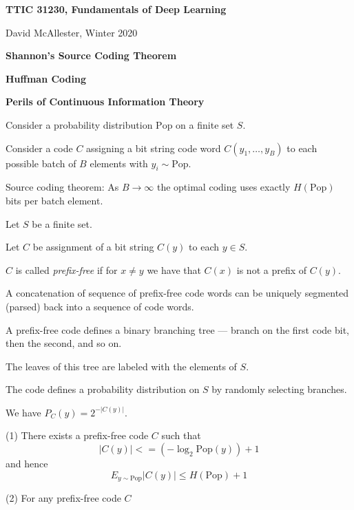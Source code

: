 




{\Huge

  \centerline{\bf TTIC 31230, Fundamentals of Deep Learning}
  \bigskip
  \centerline{David McAllester, Winter 2020}

  \vfill
  \centerline{\bf Shannon's Source Coding Theorem}
  \vfill
  \centerline{\bf Huffman Coding}
  \vfill
  \centerline{\bf Perils of Continuous Information Theory}
  \vfill
\vfill
\vfill


Consider a probability distribution $\mathrm{Pop}$ on a finite set $S$.

\vfill
Consider a code $C$ assigning a bit string code word $C(y_1,\ldots,y_B)$ to each possible batch of $B$ elements with $y_i \sim \mathrm{Pop}$.

\vfill
Source coding theorem: As $B \rightarrow \infty$ the optimal coding uses exactly $H(\mathrm{Pop})$
bits per batch element.


Let $S$ be a finite set.

\vfill
Let $C$ be assignment of a bit string $C(y)$ to each $y \in S$.

\vfill
$C$ is called {\em prefix-free} if for $x \not = y$ we have that $C(x)$ is not a prefix of $C(y)$.

\vfill
A concatenation of sequence of prefix-free code words can be uniquely segmented (parsed) back into a sequence of code words.


A prefix-free code defines a binary branching tree --- branch on the first code bit, then the second, and so on.

\vfill
The leaves of this tree are labeled with the elements of $S$.

\vfill
The code defines a probability distribution on $S$ by randomly selecting branches.

\vfill
We have $P_C(y) = 2^{-|C(y)|}$.


(1) There exists a prefix-free code $C$ such that
$$|C(y)| <= (- \log_2 \mathrm{Pop}(y)) + 1$$
and hence
$$E_{y\sim \mathrm{Pop}} |C(y)| \leq H(\mathrm{Pop}) +1$$

\vfill
(2) For any prefix-free code $C$

}
